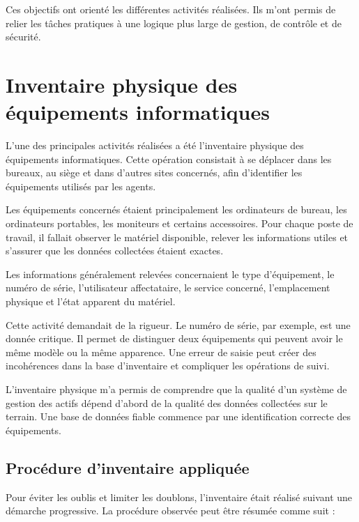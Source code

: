 \documentclass[12pt,a4paper]{report}
\begin{document}
Ces objectifs ont orienté les différentes activités réalisées. Ils m'ont permis de relier les tâches pratiques à une logique plus large de gestion, de contrôle et de sécurité.

\section{Inventaire physique des équipements informatiques}

L'une des principales activités réalisées a été l'inventaire physique des équipements informatiques. Cette opération consistait à se déplacer dans les bureaux, au siège et dans d'autres sites concernés, afin d'identifier les équipements utilisés par les agents.

Les équipements concernés étaient principalement les ordinateurs de bureau, les ordinateurs portables, les moniteurs et certains accessoires. Pour chaque poste de travail, il fallait observer le matériel disponible, relever les informations utiles et s'assurer que les données collectées étaient exactes.

Les informations généralement relevées concernaient le type d'équipement, le numéro de série, l'utilisateur affectataire, le service concerné, l'emplacement physique et l'état apparent du matériel.

Cette activité demandait de la rigueur. Le numéro de série, par exemple, est une donnée critique. Il permet de distinguer deux équipements qui peuvent avoir le même modèle ou la même apparence. Une erreur de saisie peut créer des incohérences dans la base d'inventaire et compliquer les opérations de suivi.

L'inventaire physique m'a permis de comprendre que la qualité d'un système de gestion des actifs dépend d'abord de la qualité des données collectées sur le terrain. Une base de données fiable commence par une identification correcte des équipements.

\subsection{Procédure d'inventaire appliquée}

Pour éviter les oublis et limiter les doublons, l'inventaire était réalisé suivant une démarche progressive. La procédure observée peut être résumée comme suit :
\end{document}
